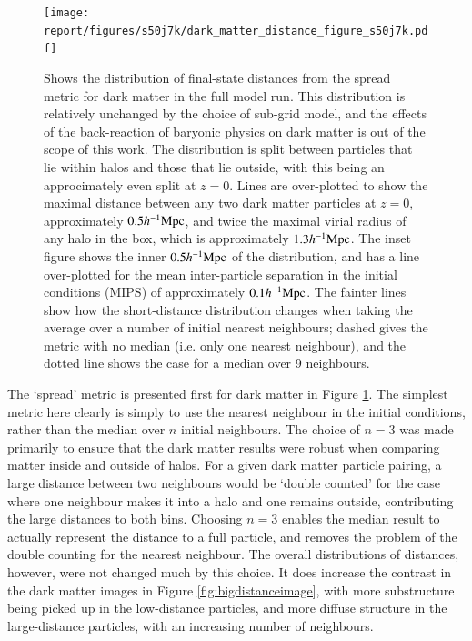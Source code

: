 \begin{figure}
    \centering
    \texttt{[image: report/figures/s50j7k/dark\_matter\_distance\_figure\_s50j7k.pdf]}
    \vspace{-0.5cm}
    \caption{Shows the distribution of final-state distances from the spread
             metric for dark matter in the full \simba{} model run. This distribution
             is relatively unchanged by the choice of sub-grid
             model, and the effects of the back-reaction of baryonic physics on dark
             matter is out of the scope of this work. The distribution is split
             between particles that lie within halos and those that lie outside, with
             this being an approcimately even split at $z=0$. Lines are over-plotted
             to show the maximal distance between any two dark matter particles at $z=0$,
             approximately $0.5h^{-1}{\rm Mpc}{}$, and twice the maximal virial radius of any halo 
             in the box, which is approximately $1.3h^{-1}{\rm Mpc}{}$. The inset figure
             shows the inner $0.5h^{-1}{\rm Mpc}{}$ of the distribution, and has a line over-plotted
             for the mean inter-particle separation in the initial conditions (MIPS)
             of approximately $0.1h^{-1}{\rm Mpc}$. The fainter lines show how the short-distance
             distribution changes when taking the average over a number of initial nearest
             neighbours; dashed gives the metric with no median (i.e. only one nearest
             neighbour), and the dotted line shows the case for a median over 9 neighbours.
            }
    \vspace{-0.5cm}
    \label{fig:dmonlyspread}
\end{figure}

The `spread' metric is presented first for dark matter in Figure \ref{fig:dmonlyspread}.
The simplest metric here clearly is simply to use the nearest neighbour in the
initial conditions, rather than the median over $n$ initial neighbours. The
choice of $n=3$ was made primarily to ensure that the dark matter results were
robust when comparing matter inside and outside of halos. For a given
dark matter particle pairing, a large distance between two neighbours
would be `double counted' for the case where one neighbour makes it into
a halo and one remains outside, contributing the large distances to both
bins. Choosing $n=3$ enables the median result to actually represent the
distance to a full particle, and removes the problem of the double counting
for the nearest neighbour. The overall distributions of distances, however,
were not changed much by this choice. It does increase the contrast in the
dark matter images in Figure \ref{fig:bigdistanceimage}, with more substructure
being picked up in the low-distance particles, and more diffuse structure in the
large-distance particles, with an increasing number of neighbours.

